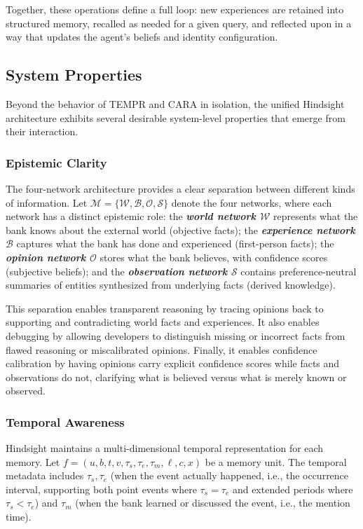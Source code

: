 Together, these operations define a full loop: new experiences are retained into structured memory, recalled as needed for a given query, and reflected upon in a way that updates the agent's beliefs and identity configuration.

\iffalse
\subsection{System Properties}

Beyond the behavior of TEMPR and CARA in isolation, the unified Hindsight architecture exhibits several desirable system-level properties that emerge from their interaction.

\subsubsection{Epistemic Clarity}

The four-network architecture provides a clear separation between different kinds of information. Let $\mathcal{M} = \{\mathcal{W}, \mathcal{B}, \mathcal{O}, \mathcal{S}\}$ denote the four networks, where each network has a distinct epistemic role: the \textbf{\textit{world network $\mathcal{W}$}} represents what the bank knows about the external world (objective facts); the \textbf{\textit{experience network $\mathcal{B}$}} captures what the bank has done and experienced (first-person facts); the \textbf{\textit{opinion network $\mathcal{O}$}} stores what the bank believes, with confidence scores (subjective beliefs); and the \textbf{\textit{observation network $\mathcal{S}$}} contains preference-neutral summaries of entities synthesized from underlying facts (derived knowledge).

This separation enables transparent reasoning by tracing opinions back to supporting and contradicting world facts and experiences. It also enables debugging by allowing developers to distinguish missing or incorrect facts from flawed reasoning or miscalibrated opinions. Finally, it enables confidence calibration by having opinions carry explicit confidence scores while facts and observations do not, clarifying what is believed versus what is merely known or observed.

\subsubsection{Temporal Awareness}

Hindsight maintains a multi-dimensional temporal representation for each memory. Let $f = (u, b, t, v, \tau_s, \tau_e, \tau_m, \ell, c, x)$ be a memory unit. The temporal metadata includes $\tau_s, \tau_e$ (when the event actually happened, i.e., the occurrence interval, supporting both point events where $\tau_s = \tau_e$ and extended periods where $\tau_s < \tau_e$) and $\tau_m$ (when the bank learned or discussed the event, i.e., the mention time).

